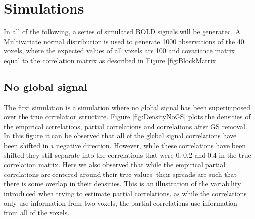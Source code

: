 \documentclass[a4paper]{article}\usepackage[]{graphicx}\usepackage[]{color}
\begin{document}
\section{Simulations}
In all of the following, a series of simulated BOLD signals will be generated.  A Multivariate normal distribution is used to generate 1000 observations of the 40 voxels, where the expected values of all voxels are 100 and covariance matrix equal to the correlation matrix as described in Figure \ref{fig:BlockMatrix}.

\subsection{No global signal}
The first simulation is a simulation where no global signal has been superimposed over the true correlation structure. Figure \ref{fig:DensityNoGS} plots the densities of the empirical correlations, partial correlations and correlations after GS removal. In this figure it can be observed that all of the global signal correlations have been shifted in a negative direction. However, while these correlations have been shifted they still separate into the correlations that were 0, 0.2 and 0.4 in the true correlation matrix. Here we also observed that while the empirical partial correlations are centered around their true values, their spreads are such that there is some overlap in their densities. This is an illustration of the variability introduced when trying to estimate partial correlations, as while the correlations only use information from two voxels, the partial correlations use information from all of the voxels.
 
\end{document}
